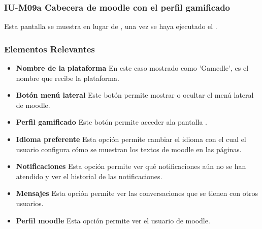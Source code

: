 
\subsubsection{IU-M09a Cabecera de moodle con el perfil gamificado}

    Esta pantalla se muestra en lugar de , una vez se haya ejecutado el .


\subsubsection{Elementos Relevantes}

    \begin{itemize}
        \item {\bf Nombre de la plataforma}
            En este caso mostrado como 'Gamedle', es el nombre que recibe la plataforma.
        \item {\bf Botón menú lateral}
            Este botón permite mostrar o ocultar el menú lateral de moodle.
        \item {\bf Perfil gamificado}
            Este botón permite acceder ala pantalla .
        \item {\bf Idioma preferente}
            Esta opción permite cambiar el idioma con el cual el usuario configura cómo se muestran los textos de moodle en las páginas.
        \item {\bf Notificaciones}
            Esta opción permite ver qué notificaciones aún no se han atendido y ver el historial de las notificaciones.
        \item {\bf Mensajes}
            Esta opción permite ver las conversaciones que se tienen con otros usuarios.
        \item {\bf Perfil moodle}
            Esta opción permite ver el usuario de moodle.
    \end{itemize}


\clearpage
